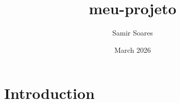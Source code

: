 \documentclass{article}
\title{meu-projeto}
\author{Samir Soares}
\date{March 2026}
\begin{document}
\maketitle

\section{Introduction}
\end{document}
